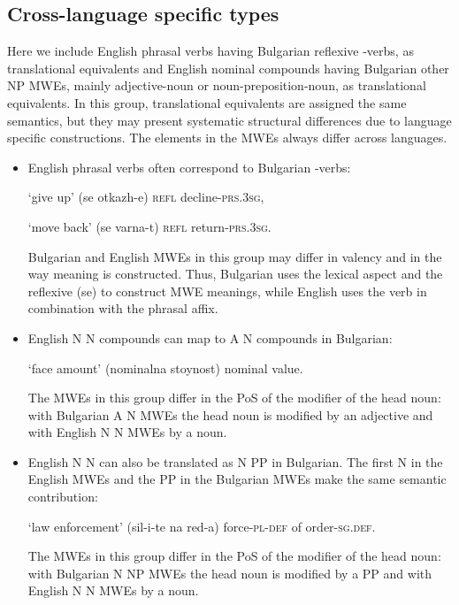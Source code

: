 \documentclass[output=paper]{langsci/langscibook}
\begin{document}
\subsection{Cross-language specific types}

Here we include English phrasal verbs having Bulgarian reflexive \textit{}-verbs, as translational equivalents and English nominal compounds having Bulgarian  other NP MWEs, mainly adjective-noun or noun-preposition-noun, as translational equivalents.
In this group, translational equivalents are assigned the same semantics, but they may present systematic structural differences due to language specific constructions. The elements in the MWEs always differ across languages.

\begin{itemize}

\item English phrasal verbs often correspond to Bulgarian \textit{}-verbs:

\osenovaitem `give up' \textit{}  (se otkazh-e) \textsc{refl} decline-\textsc{prs.3sg},

\osenovaitem `move back' \textit{} (se varna-t)  \textsc{refl} return-\textsc{prs.3sg}.

Bulgarian and English MWEs in this group may differ in valency and in the way meaning is constructed. Thus, Bulgarian uses the lexical aspect and the reflexive \textit{}  (se) to construct MWE meanings, while English uses the verb in combination with the phrasal affix.

\item English N N compounds can map to A N compounds in Bulgarian:

\osenovaitem `face amount' \textit{}  (nominalna stoynost) nominal value.

The MWEs in this group differ in the PoS of the modifier of the head noun:
with Bulgarian A N MWEs the head noun is modified by an adjective and with
English N N MWEs by a noun.

\item English N N can also be translated as N PP in Bulgarian. The first N in the English MWEs and the PP in the Bulgarian MWEs make the same semantic contribution:

\osenovaitem `law enforcement' \textit{} (sil-i-te na red-a) force-\textsc{pl-def} of order-\textsc{sg.def}.

The MWEs in this group differ in the PoS of the modifier of the head noun:
with Bulgarian N NP MWEs the head noun is modified by a PP and with English
N N MWEs by a noun.


\end{itemize}
\end{document}

